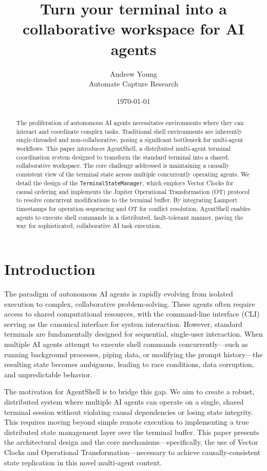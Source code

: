 \documentclass[11pt,a4paper]{article}
\title{Turn your terminal into a collaborative workspace for AI agents}
\author{Andrew Young \\ Automate Capture Research}
\date{\today}
\begin{document}
\maketitle

\begin{abstract}
The proliferation of autonomous AI agents necessitates environments where they can interact and coordinate complex tasks. Traditional shell environments are inherently single-threaded and non-collaborative, posing a significant bottleneck for multi-agent workflows. This paper introduces AgentShell, a distributed multi-agent terminal coordination system designed to transform the standard terminal into a shared, collaborative workspace. The core challenge addressed is maintaining a causally consistent view of the terminal state across multiple concurrently operating agents. We detail the design of the \texttt{TerminalStateManager}, which employs Vector Clocks for causal ordering and implements the Jupiter Operational Transformation (OT) protocol to resolve concurrent modifications to the terminal buffer. By integrating Lamport timestamps for operation sequencing and OT for conflict resolution, AgentShell enables agents to execute shell commands in a distributed, fault-tolerant manner, paving the way for sophisticated, collaborative AI task execution.
\end{abstract}

\section{Introduction}
The paradigm of autonomous AI agents is rapidly evolving from isolated execution to complex, collaborative problem-solving. These agents often require access to shared computational resources, with the command-line interface (CLI) serving as the canonical interface for system interaction. However, standard terminals are fundamentally designed for sequential, single-user interaction. When multiple AI agents attempt to execute shell commands concurrently—such as running background processes, piping data, or modifying the prompt history—the resulting state becomes ambiguous, leading to race conditions, data corruption, and unpredictable behavior.

The motivation for AgentShell is to bridge this gap. We aim to create a robust, distributed system where multiple AI agents can operate on a single, shared terminal session without violating causal dependencies or losing state integrity. This requires moving beyond simple remote execution to implementing a true distributed state management layer over the terminal buffer. This paper presents the architectural design and the core mechanisms—specifically, the use of Vector Clocks and Operational Transformation—necessary to achieve causally-consistent state replication in this novel multi-agent context.
\end{document}
